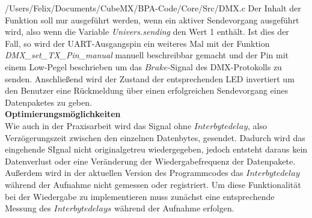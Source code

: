 
{/Users/Felix/Documents/CubeMX/BPA-Code/Core/Src/DMX.c}
Der Inhalt der Funktion soll nur ausgeführt werden, wenn ein aktiver Sendevorgang ausgeführt wird, also wenn die Variable \textit{Univers.sending} den Wert 1 enthält. Ist dies der Fall, so wird der UART-Ausgangspin ein weiteres Mal mit der Funktion \textit{DMX\_set\_TX\_Pin\_manual} manuell beschreibbar gemacht und der Pin mit einem Low-Pegel beschrieben um das $Brake$-Signal des DMX-Protokolls zu senden. Anschließend wird der Zustand der entsprechenden LED invertiert um den Benutzer eine Rückmeldung über einen erfolgreichen Sendevorgang eines Datenpaketes zu geben.\\
\newline
\textbf{Optimierungsmöglichkeiten}\\
Wie auch in der Praxisarbeit wird das Signal ohne $Interbytedelay$, also Verzögerungszeit zwischen den einzelnen Datenbytes, gesendet. Dadurch wird das eingehende SIgnal nicht originalgetreu wiedergegeben, jedoch entsteht daraus kein Datenverlust oder eine Veränderung der Wiedergabefrequenz der Datenpakete. Außerdem wird in der aktuellen Version des Programmcodes das $Interbytedelay$ während der Aufnahme nicht gemessen oder registriert. Um diese Funktionalität bei der Wiedergabe zu implementieren muss zunächst eine entsprechende Messung des $Interbytedelays$ während der Aufnahme erfolgen.